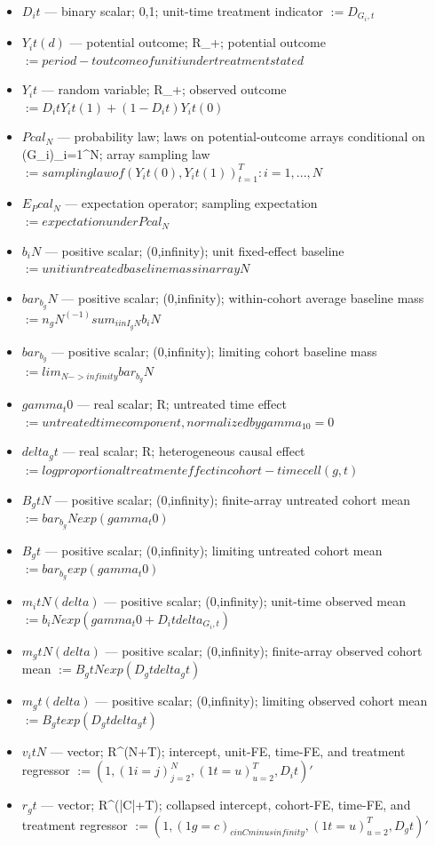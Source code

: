 \documentclass{article}
\begin{document}
\begin{itemize}
  \item $D_it$ --- binary scalar; {0,1}; unit-time treatment indicator $:= D_{G_i,t}$
  \item $Y_it(d)$ --- potential outcome; R_+; potential outcome $:= period-t outcome of unit i under treatment state d$
  \item $Y_it$ --- random variable; R_+; observed outcome $:= D_it Y_it(1)+(1-D_it)Y_it(0)$
  \item $Pcal_N$ --- probability law; laws on potential-outcome arrays conditional on (G_i)_{i=1}^N; array sampling law $:= sampling law of {(Y_it(0),Y_it(1))_{t=1}^T:i=1,...,N}$
  \item $E_Pcal_N$ --- expectation operator; sampling expectation $:= expectation under Pcal_N$
  \item $b_iN$ --- positive scalar; (0,infinity); unit fixed-effect baseline $:= unit i untreated baseline mass in array N$
  \item $bar_b_gN$ --- positive scalar; (0,infinity); within-cohort average baseline mass $:= n_gN^(-1) sum_{i in I_gN} b_iN$
  \item $bar_b_g$ --- positive scalar; (0,infinity); limiting cohort baseline mass $:= lim_{N->infinity} bar_b_gN$
  \item $gamma_t0$ --- real scalar; R; untreated time effect $:= untreated time component, normalized by gamma_10=0$
  \item $delta_gt$ --- real scalar; R; heterogeneous causal effect $:= log proportional treatment effect in cohort-time cell (g,t)$
  \item $B_gtN$ --- positive scalar; (0,infinity); finite-array untreated cohort mean $:= bar_b_gN exp(gamma_t0)$
  \item $B_gt$ --- positive scalar; (0,infinity); limiting untreated cohort mean $:= bar_b_g exp(gamma_t0)$
  \item $m_itN(delta)$ --- positive scalar; (0,infinity); unit-time observed mean $:= b_iN exp(gamma_t0+D_it delta_{G_i,t})$
  \item $m_gtN(delta)$ --- positive scalar; (0,infinity); finite-array observed cohort mean $:= B_gtN exp(D_gt delta_gt)$
  \item $m_gt(delta)$ --- positive scalar; (0,infinity); limiting observed cohort mean $:= B_gt exp(D_gt delta_gt)$
  \item $v_itN$ --- vector; R^(N+T); intercept, unit-FE, time-FE, and treatment regressor $:= (1,(1{i=j})_{j=2}^N,(1{t=u})_{u=2}^T,D_it)'$
  \item $r_gt$ --- vector; R^(|C|+T); collapsed intercept, cohort-FE, time-FE, and treatment regressor $:= (1,(1{g=c})_{c in C minus {infinity}},(1{t=u})_{u=2}^T,D_gt)'$

\end{itemize}
\end{document}
